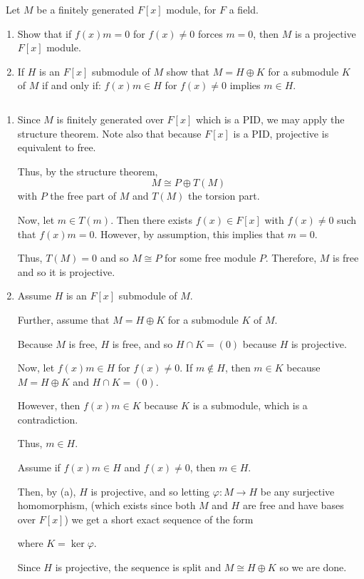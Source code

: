 \documentclass[12pt]{AlgebraQual}
\begin{document}
\begin{problem} $\,$
Let $M$ be a finitely generated $F[x]$ module, for $F$ a field.
\begin{enumerate}[label=(\alph*)]
    \item Show that if $f(x)m=0$ for $f(x)\not=0$ forces $m=0$, then $M$ is a projective $F[x]$ module.
    \item If $H$ is an $F[x]$ submodule of $M$ show that $M=H\oplus K$ for a submodule $K$ of $M$ if and only if: $f(x)m\in H$ for $f(x)\not=0$ implies $m\in H.$
\end{enumerate}
\end{problem}


\begin{solution}$\,$
\begin{enumerate}[label=(\alph*)]
    \item Since $M$ is finitely generated over $F[x]$ which is a PID, we may apply the structure theorem. Note also that because $F[x]$ is a PID, projective is equivalent to free.

    Thus, by the structure theorem, $$M\cong P\oplus T(M)$$ with $P$ the free part of $M$ and $T(M)$ the torsion part.

    Now, let $m\in T(m)$. Then there exists $f(x)\in F[x]$ with $f(x)\not=0$ such that $f(x)m=0$. However, by assumption, this implies that $m=0$.

    Thus, $T(M)=0$ and so $M\cong P$ for some free module $P$. Therefore, $M$ is free and so it is projective.

    \item \boxed{\implies} Assume $H$ is an $F[x]$ submodule of $M$.

    Further, assume that $M=H\oplus K$ for a submodule $K$ of $M$.

    Because $M$ is free, $H$ is free, and so $H\cap K=(0)$ because $H$ is projective.

    Now, let $f(x)m\in H$ for $f(x)\not=0$. If $m\notin H$, then $m\in K$ because $M=H\oplus K$ and $H\cap K=(0)$.

    However, then $f(x)m\in K$ because $K$ is a submodule, which is a contradiction.

    Thus, $m\in H$.

    \boxed{\impliedby} Assume if $f(x)m\in H$ and $f(x)\not=0$, then $m\in H$.

    Then, by (a), $H$ is projective, and so letting $\varphi:M\to H$ be any surjective homomorphism, (which exists since both $M$ and $H$ are free and have bases over $F[x]$) we get a short exact sequence of the form
    \begin{center}
    \end{center} where $K=\ker\varphi$.

    Since $H$ is projective, the sequence is split and $M\cong H\oplus K$ so we are done.
\end{enumerate}
\end{solution}
\newpage
\end{document}
